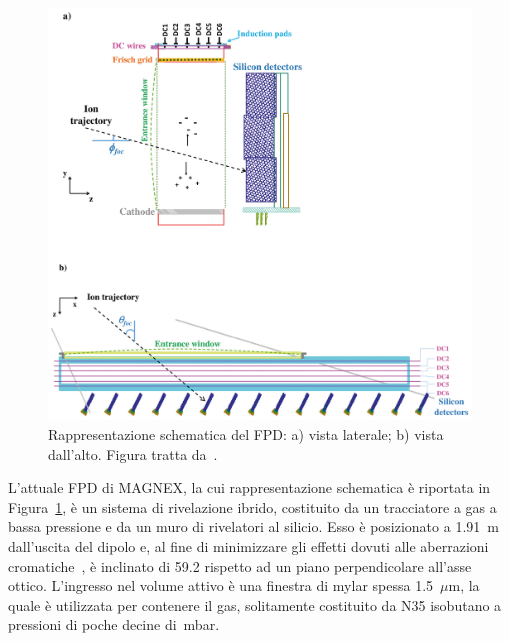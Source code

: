 \begin{figure} [!p]
	\centering
	\includegraphics[width=\textwidth, keepaspectratio]{Grafici/fpd.png}
	\caption{Rappresentazione schematica del FPD: a) vista laterale; b) vista dall'alto. Figura tratta da~\cite{cappuzzello:epja18}.} \label{fig:fpd}
\end{figure}


L'attuale FPD di MAGNEX, la cui rappresentazione schematica è riportata in Figura~\ref{fig:fpd}, è un sistema di rivelazione ibrido, costituito da un tracciatore a gas a bassa pressione e da un muro di rivelatori al silicio.
Esso è posizionato a 1.91~m dall'uscita del dipolo e, al fine di minimizzare gli effetti dovuti alle aberrazioni cromatiche~\cite{cunsolo:nima01}, è inclinato di 59.2\textdegree{} rispetto ad un piano perpendicolare all'asse ottico.
L'ingresso nel volume attivo è una finestra di mylar spessa 1.5~$\mu$m, la quale è utilizzata per contenere il gas, solitamente costituito da N35 isobutano a pressioni di poche decine di~mbar.



